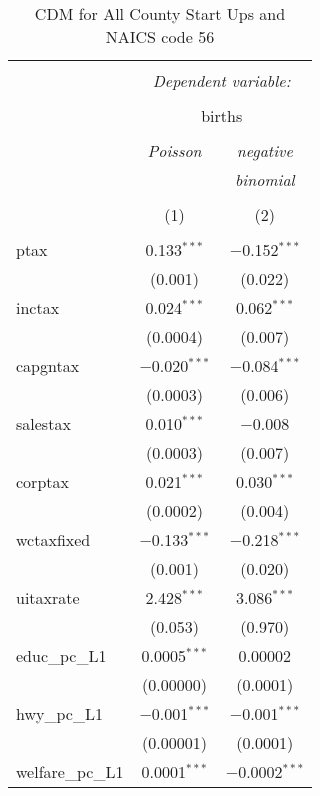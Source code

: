 
\begin{table}[!htbp] \centering 
  \caption{CDM for All County Start Ups and NAICS code 56} 
  \label{} 
\begin{tabular}{@{\extracolsep{5pt}}lcc} 
\\[-1.8ex]\hline 
\hline \\[-1.8ex] 
 & \multicolumn{2}{c}{\textit{Dependent variable:}} \\ 
\cline{2-3} 
\\[-1.8ex] & \multicolumn{2}{c}{births} \\ 
\\[-1.8ex] & \textit{Poisson} & \textit{negative} \\ 
 & \textit{} & \textit{binomial} \\ 
\\[-1.8ex] & (1) & (2)\\ 
\hline \\[-1.8ex] 
 ptax & 0.133$^{***}$ & $-$0.152$^{***}$ \\ 
  & (0.001) & (0.022) \\ 
  inctax & 0.024$^{***}$ & 0.062$^{***}$ \\ 
  & (0.0004) & (0.007) \\ 
  capgntax & $-$0.020$^{***}$ & $-$0.084$^{***}$ \\ 
  & (0.0003) & (0.006) \\ 
  salestax & 0.010$^{***}$ & $-$0.008 \\ 
  & (0.0003) & (0.007) \\ 
  corptax & 0.021$^{***}$ & 0.030$^{***}$ \\ 
  & (0.0002) & (0.004) \\ 
  wctaxfixed & $-$0.133$^{***}$ & $-$0.218$^{***}$ \\ 
  & (0.001) & (0.020) \\ 
  uitaxrate & 2.428$^{***}$ & 3.086$^{***}$ \\ 
  & (0.053) & (0.970) \\ 
  educ\_pc\_L1 & 0.0005$^{***}$ & 0.00002 \\ 
  & (0.00000) & (0.0001) \\ 
  hwy\_pc\_L1 & $-$0.001$^{***}$ & $-$0.001$^{***}$ \\ 
  & (0.00001) & (0.0001) \\ 
  welfare\_pc\_L1 & 0.0001$^{***}$ & $-$0.0002$^{***}$ \\ 

\end{tabular}
\end{table}
